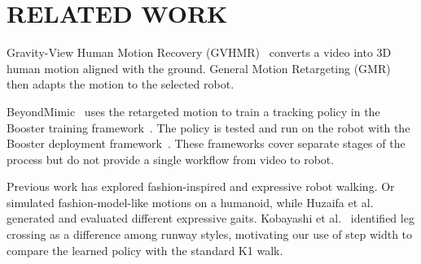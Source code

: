 \vspace{-1 mm}
\section{RELATED WORK}
\vspace{-1 mm}
Gravity-View Human Motion Recovery (GVHMR)~\cite{gvhmr} converts a video into 3D human motion aligned with the ground. General Motion Retargeting (GMR)~\cite{gmr} then adapts the motion to the selected robot.

BeyondMimic~\cite{beyondmimic} uses the retargeted motion to train a tracking policy in the Booster training framework~\cite{boostertrain}. The policy is tested and run on the robot with the Booster deployment framework~\cite{boosterdeploy}. These frameworks cover separate stages of the process but do not provide a single workflow from video to robot.

Previous work has explored fashion-inspired and expressive robot walking. Or~\cite{fashionmodelrobot} simulated fashion-model-like motions on a humanoid, while Huzaifa et al.~\cite{expressivegait} generated and evaluated different expressive gaits. Kobayashi et al.~\cite{catwalkstyles} identified leg crossing as a difference among runway styles, motivating our use of step width to compare the learned policy with the standard K1 walk.

